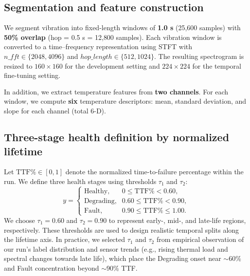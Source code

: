\documentclass{article}
\begin{document}
\subsection{Segmentation and feature construction}
We segment vibration into fixed-length windows of \textbf{1.0 s} (25{,}600 samples) with \textbf{50\% overlap} (hop = 0.5 s = 12{,}800 samples). 
Each vibration window is converted to a time--frequency representation using STFT with $n\_fft \in \{2048,4096\}$ and $hop\_length \in \{512,1024\}$. 
The resulting spectrogram is resized to \textbf{$160\times160$} for the development setting and \textbf{$224\times224$} for the temporal fine-tuning setting.

In addition, we extract temperature features from \textbf{two channels}. 
For each window, we compute \textbf{six} temperature descriptors: mean, standard deviation, and slope for each channel (total 6-D).

\subsection{Three-stage health definition by normalized lifetime}
Let $\mathrm{TTF\%} \in [0,1]$ denote the normalized time-to-failure percentage within the run. 
We define three health stages using thresholds $\tau_1$ and $\tau_2$:
\begin{equation}
y=
\begin{cases}
\text{Healthy}, & 0 \le \mathrm{TTF\%} < 0.60,\\
\text{Degrading}, & 0.60 \le \mathrm{TTF\%} < 0.90,\\
\text{Fault}, & 0.90 \le \mathrm{TTF\%} \le 1.00.
\end{cases}
\label{eq:stage_labeling}
\end{equation}
We choose $\tau_1=0.60$ and $\tau_2=0.90$ to represent early-, mid-, and late-life regions, respectively. 
These thresholds are used to design realistic temporal splits along the lifetime axis. In practice, we selected $\tau_1$ and $\tau_2$ from empirical observation of our run's label distribution and sensor trends (e.g., rising thermal load and spectral changes towards late life), which place the Degrading onset near $\sim$60\% and Fault concentration beyond $\sim$90\% TTF.
\end{document}
